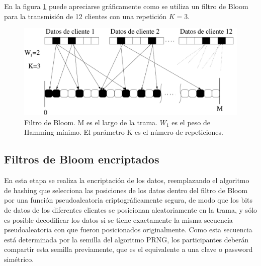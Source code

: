 En la figura \ref{fig:Bloomf} puede apreciarse gráficamente como se utiliza un filtro de Bloom para la transmisión de 12 clientes con una repetición $K=3$. 

\begin{figure}[th]
  \begin{center}
    \includegraphics[scale=0.55]{graphs/frame-sp}
  \end{center}
  \caption{Filtro de Bloom. M es el largo de la trama. $W_1$ es el peso de Hamming mínimo. El parámetro K es el número de repeticiones.}
  \label{fig:Bloomf}
\end{figure}


\subsection{Filtros de Bloom encriptados}

En esta etapa se realiza la encriptación de los datos, reemplazando el algoritmo de hashing que selecciona las posiciones de los datos dentro del filtro de Bloom por una función pseudoaleatoria criptográficamente segura, de modo que los bits de datos de los diferentes clientes se posicionan aleatoriamente en la trama, y sólo es posible decodificar los datos si se tiene exactamente la misma secuencia pseudoaleatoria con que fueron posicionados originalmente. Como esta secuencia está determinada por la semilla del algoritmo PRNG, los participantes deberán compartir esta semilla previamente, que es el equivalente a una clave o password simétrico. 

